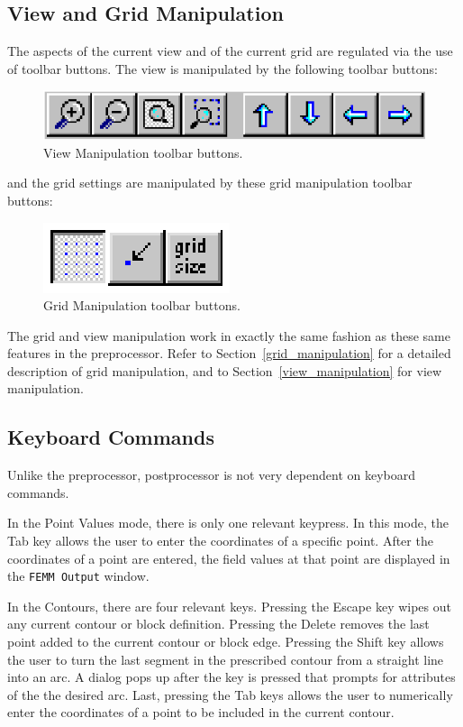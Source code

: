 \documentclass[12pt]{report}
\begin{document}
\subsection {View and Grid Manipulation}

The aspects of the current view and of the current grid are
regulated via the use of toolbar buttons.  The view is manipulated
by the following toolbar buttons:
\begin{figure}[ht]
\centerline{\includegraphics{belaman3.ps}}
\caption{View Manipulation toolbar buttons.}
\end{figure}
and the grid settings are manipulated by these grid manipulation
toolbar buttons:
\begin{figure}[ht]
\centerline{\includegraphics{gridbtn.ps}}
\caption{Grid Manipulation toolbar buttons.}
\end{figure}
The grid and view manipulation work in exactly the same fashion as
these same features in the preprocessor.  Refer to
Section~\ref{grid_manipulation} for a detailed description of grid
manipulation, and to Section~\ref{view_manipulation} for view
manipulation.

\subsection{Keyboard Commands}

Unlike the preprocessor, postprocessor is not very dependent on
keyboard commands.

In the Point Values mode, there is only one relevant keypress. In
this mode, the Tab key allows the user to enter the coordinates of
a specific point.  After the coordinates of a point are entered,
the field values at that point are displayed in the {\tt FEMM
Output} window.

In the Contours, there are four relevant keys. Pressing the Escape
key wipes out any current contour or block definition. Pressing the
Delete removes the last point added to the current contour or block
edge.  Pressing the Shift key allows the user to turn the last segment
in the prescribed contour from a straight line into an arc.  A dialog
pops up after the key is pressed that prompts for attributes of the
the desired arc. Last, pressing the Tab keys allows the user to numerically
enter the coordinates of a point to be included in the current
contour.
\end{document}
